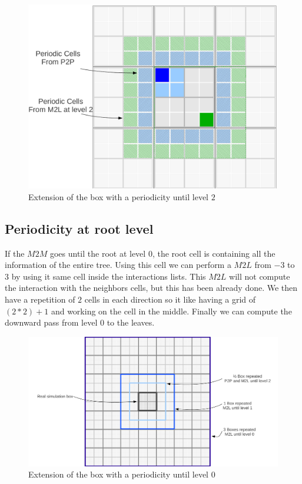 \documentclass[12pt]{article} %
\begin{document}
\begin{figure}[h]
\centering
\includegraphics[scale=0.35]{Images/PeriodicL2}
\caption{Extension of the box with a periodicity until level $2$}
\end{figure}

\subsection{Periodicity at root level}
If the $M2M$ goes until the root at level $0$, the root cell is containing all the information of the entire tree.
Using this cell we can perform a $M2L$ from $-3$ to $3$ by using it same cell inside the interactions lists.
This $M2L$ will not compute the interaction with the neighbors cells, but this has been already done.
We then have a repetition of $2$ cells in each direction so it like having a grid of $(2*2)+1$ and working on the cell in the middle.
Finally we can compute the downward pass from level $0$ to the leaves.

\begin{figure}[h]
\centering
\includegraphics[scale=0.45]{Images/PeriodicL0}
\caption{Extension of the box with a periodicity until level $0$}
\end{figure}
\end{document}

